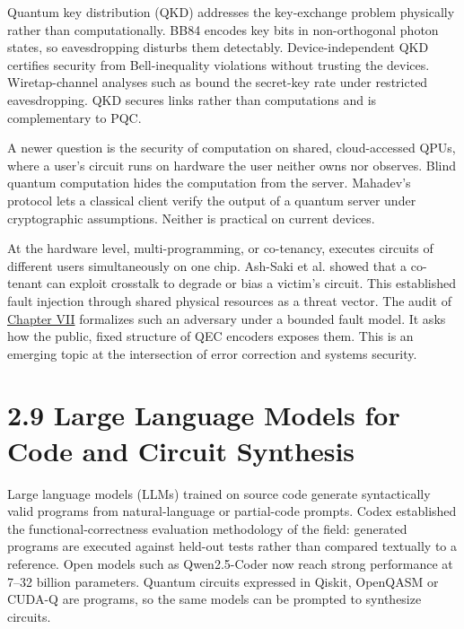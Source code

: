 \documentclass{report}
\theoremstyle{plain}
\theoremstyle{definition}
\theoremstyle{remark}
\begin{document}
Quantum key distribution (QKD) addresses the key-exchange problem physically rather than computationally. BB84 \cite{bennett1984bb84} encodes key bits in non-orthogonal photon states, so eavesdropping disturbs them detectably. Device-independent QKD \cite{vazirani2014diqkd} certifies security from Bell-inequality violations without trusting the devices. Wiretap-channel analyses such as \cite{pan2020secretkey} bound the secret-key rate under restricted eavesdropping. QKD secures links rather than computations and is complementary to PQC.

A newer question is the security of computation on shared, cloud-accessed QPUs, where a user's circuit runs on hardware the user neither owns nor observes. Blind quantum computation \cite{broadbent2009blind} hides the computation from the server. Mahadev's protocol \cite{mahadev2018verification} lets a classical client verify the output of a quantum server under cryptographic assumptions. Neither is practical on current devices.

At the hardware level, multi-programming, or co-tenancy, executes circuits of different users simultaneously on one chip. Ash-Saki et al. \cite{ashsaki2020crosstalk} showed that a co-tenant can exploit crosstalk to degrade or bias a victim's circuit. This established fault injection through shared physical resources as a threat vector. The audit of \hyperref[ch:qec]{Chapter VII} \cite{guo2026qecaudit} formalizes such an adversary under a bounded fault model. It asks how the public, fixed structure of QEC encoders exposes them. This is an emerging topic at the intersection of error correction and systems security.

\section{2.9 Large Language Models for Code and Circuit Synthesis}\label{sec:bg:llm}

Large language models (LLMs) trained on source code generate syntactically valid programs from natural-language or partial-code prompts. Codex \cite{chen2021codex} established the functional-correctness evaluation methodology of the field: generated programs are executed against held-out tests rather than compared textually to a reference. Open models such as Qwen2.5-Coder \cite{hui2024qwen25coder} now reach strong performance at 7--32 billion parameters. Quantum circuits expressed in Qiskit, OpenQASM or CUDA-Q are programs, so the same models can be prompted to synthesize circuits.
\end{document}
